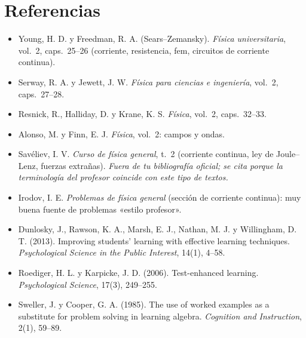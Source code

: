 \documentclass[11pt]{article}
\begin{document}
\section*{Referencias}
\small
\begin{itemize}
\item Young, H. D. y Freedman, R. A. (Sears--Zemansky). \emph{Física universitaria}, vol.~2, caps.~25--26 (corriente, resistencia, fem, circuitos de corriente continua).
\item Serway, R. A. y Jewett, J. W. \emph{Física para ciencias e ingeniería}, vol.~2, caps.~27--28.
\item Resnick, R., Halliday, D. y Krane, K. S. \emph{Física}, vol.~2, caps.~32--33.
\item Alonso, M. y Finn, E. J. \emph{Física}, vol.~2: campos y ondas.
\item Savéliev, I. V. \emph{Curso de física general}, t.~2 (corriente continua, ley de Joule--Lenz, fuerzas extrañas). \emph{Fuera de tu bibliografía oficial; se cita porque la terminología del profesor coincide con este tipo de textos.}
\item Irodov, I. E. \emph{Problemas de física general} (sección de corriente continua): muy buena fuente de problemas «estilo profesor».
\item Dunlosky, J., Rawson, K. A., Marsh, E. J., Nathan, M. J. y Willingham, D. T. (2013). Improving students' learning with effective learning techniques. \emph{Psychological Science in the Public Interest}, 14(1), 4--58.
\item Roediger, H. L. y Karpicke, J. D. (2006). Test-enhanced learning. \emph{Psychological Science}, 17(3), 249--255.
\item Sweller, J. y Cooper, G. A. (1985). The use of worked examples as a substitute for problem solving in learning algebra. \emph{Cognition and Instruction}, 2(1), 59--89.
\end{itemize}
\end{document}
